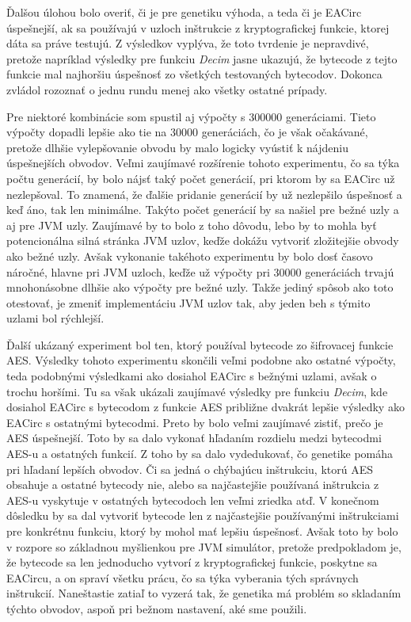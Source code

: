 Ďalšou úlohou bolo overiť, či je pre genetiku výhoda, a teda či je EACirc úspešnejší, ak sa používajú v uzloch inštrukcie z kryptografickej funkcie, ktorej dáta sa práve testujú. Z výsledkov vyplýva, že toto tvrdenie je nepravdivé, pretože napríklad výsledky pre funkciu \textit{Decim} jasne ukazujú, že bytecode z tejto funkcie mal najhoršiu úspešnosť zo všetkých testovaných bytecodov. Dokonca zvládol rozoznať o jednu rundu menej ako všetky ostatné prípady.

Pre niektoré kombinácie som spustil aj výpočty s 300000 generáciami. Tieto výpočty dopadli lepšie ako tie na 30000 generáciách, čo je však očakávané, pretože dlhšie vylepšovanie obvodu by malo logicky vyústiť k nájdeniu úspešnejších obvodov. Veľmi zaujímavé rozšírenie tohoto experimentu, čo sa týka počtu generácií, by bolo nájsť taký počet generácií, pri ktorom by sa EACirc už nezlepšoval. To znamená, že ďalšie pridanie generácií by už nezlepšilo úspešnosť a keď áno, tak len minimálne. Takýto počet generácií by sa našiel pre bežné uzly a aj pre JVM uzly. Zaujímavé by to bolo z toho dôvodu, lebo by to mohla byť potencionálna silná stránka JVM uzlov, keďže dokážu vytvoriť zložitejšie obvody ako bežné uzly. Avšak vykonanie takéhoto experimentu by bolo dosť časovo náročné, hlavne pri JVM uzloch, keďže už výpočty pri 30000 generáciách trvajú mnohonásobne dlhšie ako výpočty pre bežné uzly. Takže jediný spôsob ako toto otestovať, je zmeniť implementáciu JVM uzlov tak, aby jeden beh s týmito uzlami bol rýchlejší.

Ďalší ukázaný experiment bol ten, ktorý používal bytecode zo šifrovacej funkcie AES. Výsledky tohoto experimentu skončili veľmi podobne ako ostatné výpočty, teda podobnými výsledkami ako dosiahol EACirc s bežnými uzlami, avšak o trochu horšími. Tu sa však ukázali zaujímavé výsledky pre funkciu \textit{Decim}, kde dosiahol EACirc s bytecodom z funkcie AES približne dvakrát lepšie výsledky ako EACirc s ostatnými bytecodmi. Preto by bolo veľmi zaujímavé zistiť, prečo je AES úspešnejší. Toto by sa dalo vykonať hľadaním rozdielu medzi bytecodmi AES-u a ostatných funkcií. Z toho by sa dalo vydedukovať, čo genetike pomáha pri hľadaní lepších obvodov. Či sa jedná o chýbajúcu inštrukciu, ktorú AES obsahuje a ostatné bytecody nie, alebo sa najčastejšie používaná inštrukcia z AES-u vyskytuje v ostatných bytecodoch len veľmi zriedka atď. V konečnom dôsledku by sa dal vytvoriť bytecode len z najčastejšie používanými inštrukciami pre konkrétnu funkciu, ktorý by mohol mať lepšiu úspešnosť. Avšak toto by bolo v rozpore so základnou myšlienkou pre JVM simulátor, pretože predpokladom je, že bytecode sa len jednoducho vytvorí z kryptografickej funkcie, poskytne sa EACircu, a on spraví všetku prácu, čo sa týka vyberania tých správnych inštrukcií. Naneštastie zatiaľ to vyzerá tak, že genetika má problém so skladaním týchto obvodov, aspoň pri bežnom nastavení, aké sme použili.

